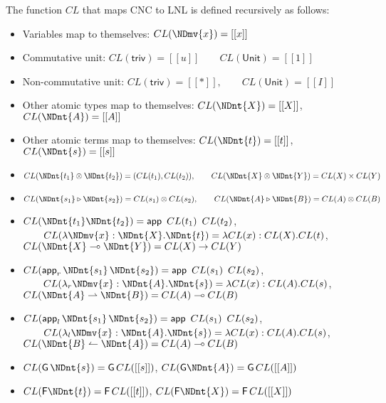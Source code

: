 \begin{definition}
  The function $CL$ that maps CNC to LNL is defined recursively as follows:
  \begin{itemize}
  \item Variables map to themselves: $CL(\NDmv{x}) = [[x]]$
  \item Commutative unit: $CL( \mathsf{triv} ) = [[u]] \qquad CL( \mathsf{Unit} ) = [[1]]$
  \item Non-commutative unit: $CL( \mathsf{triv} ) = [[*]], \qquad CL( \mathsf{Unit} ) = [[I]]$
  \item Other atomic types map to themselves: $CL(\NDnt{X}) = [[X]]$,
        $CL(\NDnt{A}) = [[A]]$
  \item Other atomic terms map to themselves: $CL(\NDnt{t}) = [[t]]$,
        $CL(\NDnt{s}) = [[s]]$
  \item $CL(\NDnt{t_{{\mathrm{1}}}}  \otimes  \NDnt{t_{{\mathrm{2}}}}) = (CL(t_1),CL(t_2)), \qquad CL(\NDnt{X}  \otimes  \NDnt{Y})=CL(X)\times CL(Y) $
  \item $CL(\NDnt{s_{{\mathrm{1}}}}  \triangleright  \NDnt{s_{{\mathrm{2}}}}) = CL(s_1)\otimes CL(s_2), \qquad CL(\NDnt{A}  \triangleright  \NDnt{B})=CL(A)\otimes CL(B)$
  \item $CL( \NDnt{t_{{\mathrm{1}}}}   \NDnt{t_{{\mathrm{2}}}} ) = \mathsf{app}\,\,\,CL(t_1)\,\,\,CL(t_2)$,
        $\qquad CL( \lambda  \NDmv{x}  :  \NDnt{X} . \NDnt{t} ) = \lambda CL(x):CL(X).CL(t)$,\\
        $CL(\NDnt{X}  \multimap  \NDnt{Y}) = CL(X) \rightarrow CL(Y)$
  \item $CL( \mathsf{app}_r\, \NDnt{s_{{\mathrm{1}}}} \, \NDnt{s_{{\mathrm{2}}}} ) = \mathsf{app}\,\,\,CL(s_1)\,\,\,CL(s_2)$,
        $\qquad CL( \lambda_r  \NDmv{x}  :  \NDnt{A} . \NDnt{s} ) = \lambda CL(x):CL(A).CL(s)$,\\
        $CL(\NDnt{A}  \rightharpoonup  \NDnt{B}) = CL(A) \multimap CL(B)$
  \item $CL( \mathsf{app}_l\, \NDnt{s_{{\mathrm{1}}}} \, \NDnt{s_{{\mathrm{2}}}} ) = \mathsf{app}\,\,\,CL(s_1)\,\,\,CL(s_2)$,
        $\qquad CL( \lambda_l  \NDmv{x}  :  \NDnt{A} . \NDnt{s} ) = \lambda CL(x):CL(A).CL(s)$,\\
        $CL(\NDnt{B}  \leftharpoonup  \NDnt{A}) = CL(A) \multimap CL(B)$
  \item $CL( \mathsf{G}\, \NDnt{s} ) = \mathsf{G}\,CL([[s]])$, \qquad $CL( \mathsf{G} \NDnt{A} ) = \mathsf{G}\,CL([[A]])$
  \item $CL( \mathsf{F} \NDnt{t} ) = \mathsf{F}\,CL([[t]])$, \qquad $CL( \mathsf{F} \NDnt{X} ) = \mathsf{F}\,CL([[X]])$

\end{itemize}
\end{definition}
